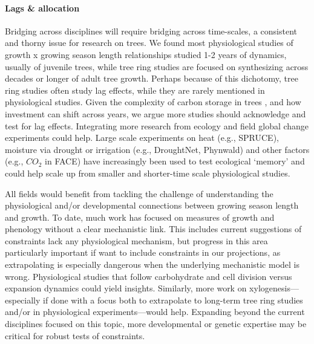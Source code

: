 \documentclass[11pt]{article}
\begin{document}
\paragraph{Lags \& allocation}

Bridging across disciplines will require bridging across time-scales, a consistent and thorny issue for research on trees. We found most physiological studies of growth x growing season length relationships studied 1-2 years of dynamics, usually of juvenile trees, while tree ring studies are focused on synthesizing across decades or longer of adult tree growth. Perhaps because of this dichotomy, tree ring studies often study lag effects, while they are rarely mentioned in physiological studies. Given the complexity of carbon storage in trees \citep{finzi2020,thompson2023no,anderson2022drives}, and how investment can shift across years, we argue more studies should acknowledge and test for lag effects. Integrating more research from ecology and field global change experiments could help. Large scale experiments on heat (e.g., SPRUCE), moisture via drought or irrigation (e.g., DroughtNet, Phynwald) and other factors (e.g., $CO_2$ in FACE) have increasingly been used to test ecological `memory' and could help scale up from smaller and shorter-time scale physiological studies.

All fields would benefit from tackling the challenge of understanding the physiological and/or developmental connections between growing season length and growth. To date, much work has focused on measures of growth and phenology without a clear mechanistic link. This includes current suggestions of constraints lack any physiological mechanism, but progress in this area particularly important if want to include constraints in our projections, as extrapolating is especially dangerous when the underlying mechanistic model is wrong. Physiological studies that follow carbohydrate and cell division versus expansion dynamics could yield insights. Similarly, more work on xylogenesis---especially if done with a focus both to extrapolate to long-term tree ring studies and/or in physiological experiments---would help. Expanding beyond the current disciplines focused on this topic, more developmental or genetic expertise may be critical for robust tests of constraints. 
\end{document}

